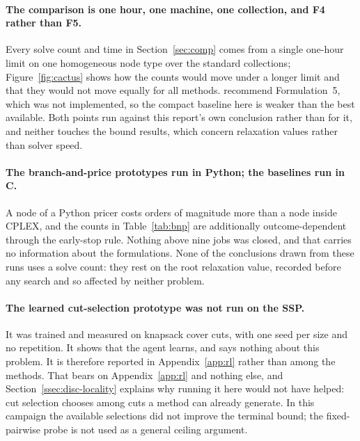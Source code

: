 \paragraph{The comparison is one hour, one machine, one collection, and F4 rather than F5.}
Every solve count and time in Section~\ref{sec:comp} comes from a single one-hour limit
on one homogeneous node type over the standard collections;
Figure~\ref{fig:cactus} shows how the counts would move under a longer limit and that
they would not move equally for all methods. \citet{Catanzaro2015} recommend
Formulation~5, which was not implemented, so the compact baseline here is weaker than
the best available. Both points run against this report's own conclusion rather than for
it, and neither touches the bound results, which concern relaxation values rather than
solver speed.

\paragraph{The branch-and-price prototypes run in Python; the baselines run in C.}
A node of a Python pricer costs orders of magnitude more than a node inside CPLEX, and
the counts in Table~\ref{tab:bnp} are additionally outcome-dependent through the
early-stop rule. Nothing above nine jobs was closed, and that carries no information
about the formulations. None of the conclusions drawn from these runs uses a solve
count: they rest on the root relaxation value, recorded before any search and so
affected by neither problem.

\paragraph{The learned cut-selection prototype was not run on the SSP.}
It was trained and measured on knapsack cover cuts, with one seed per size and no
repetition. It shows that the agent learns, and says nothing about this problem. It is
therefore reported in Appendix~\ref{app:rl} rather than among the methods. That bears
on Appendix~\ref{app:rl} and nothing else, and
Section~\ref{ssec:disc-locality} explains why running it here would not have helped:
cut selection chooses among cuts a method can already generate. In this campaign the
available selections did not improve the terminal bound; the fixed-pairwise probe is
not used as a general ceiling argument.
